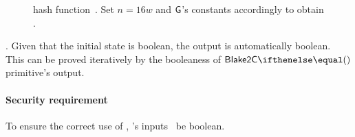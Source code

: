 \begin{figure*}[h!]
  \centering
  \caption{ hash function~\cite[Section 3.3]{blakecompietf}. Set $n=16w$ and $\mathsf{G}$'s constants accordingly to obtain .}\label{implementation:alg:blake2s_hash}
\end{figure*}

. Given that the initial state is boolean, the output is automatically boolean. This can be proved iteratively by the booleaness of $\blake{2C}{}$ primitive's output.

\paragraph*{Security requirement}

To ensure the correct use of , 's inputs \MUST~be boolean.

